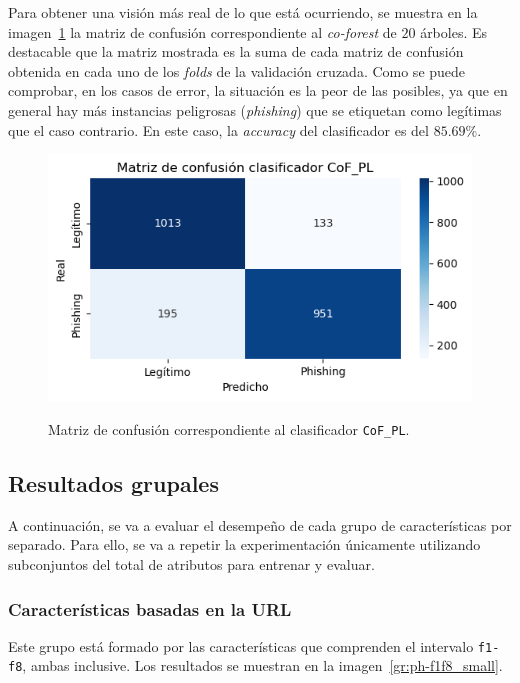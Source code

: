 Para obtener una visión más real de lo que está ocurriendo, se muestra en la imagen~\ref{gr:ph-f1f19_cof_clt} la matriz de confusión correspondiente al \textit{co-forest} de $20$ árboles. Es destacable que la matriz mostrada es la suma de cada matriz de confusión obtenida en cada uno de los \textit{folds} de la validación cruzada. Como se puede comprobar, en los casos de error, la situación es la peor de las posibles, ya que en general hay más instancias peligrosas (\textit{phishing}) que se etiquetan como legítimas que el caso contrario. En este caso, la \textit{accuracy} del clasificador es del $85$.$69\%$.

\begin{figure}[h]
	\caption[\textit{Phishing}: detección (\texttt{f1-f19}, matriz de confusión \texttt{CoF\_PL})]{Matriz de confusión correspondiente al clasificador \texttt{CoF\_PL}.}
	\centering
	\includegraphics[scale=0.8]{../img/memoria/5_phishing/f1f19_cof_clt}
	\label{gr:ph-f1f19_cof_clt}
\end{figure}

\subsection{Resultados grupales}

A continuación, se va a evaluar el desempeño de cada grupo de características por separado. Para ello, se va a repetir la experimentación únicamente utilizando subconjuntos del total de atributos para entrenar y evaluar.

\subsubsection{Características basadas en la URL}

Este grupo está formado por las características que comprenden el intervalo \texttt{f1-f8}, ambas inclusive. Los resultados se muestran en la imagen~\ref{gr:ph-f1f8_small}.

